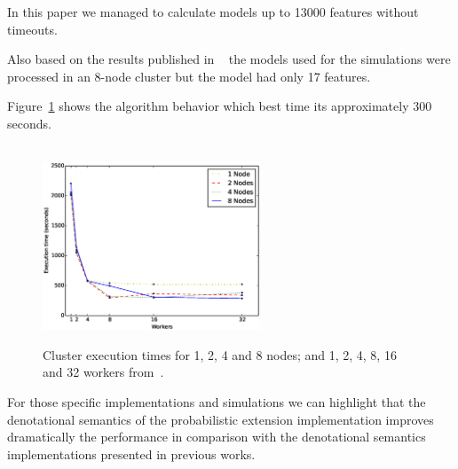 In this paper we managed to calculate models up to 
13000 features without timeouts.

Also based on the results published in \fodaPAc~\cite{clc16}
the models used for the simulations were processed in 
an 8-node cluster but the model had only
17 features.

Figure~\ref{fig:cluster} shows the algorithm behavior 
which best time its approximately 300 seconds.


\begin{figure}[t]
	\centering
	\linefigure
	\\
	\includegraphics[width=0.7\hsize, height=5cm,angle=0]{plot_cluster.eps}
	\linefigure
	\caption{Cluster execution times for 1, 2, 4 and 8 nodes; and 1, 2, 4, 8, 16 and 32 workers  from~\cite{clc16}.}\label{fig:cluster}
\end{figure}

For those specific implementations and
simulations we can highlight
that the denotational semantics of the probabilistic
extension implementation improves dramatically
the performance
in comparison with the denotational semantics implementations
presented in previous works.




















